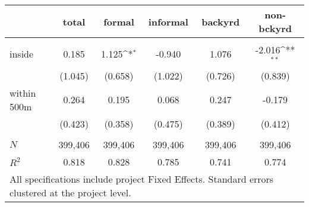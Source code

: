 {
\def\sym#1{\ifmmode^{#1}\else\(^{#1}\)\fi}
\begin{tabular}{l*{5}{c}}

          &\multicolumn{1}{c}{total}         &\multicolumn{1}{c}{formal}         &\multicolumn{1}{c}{informal}         &\multicolumn{1}{c}{backyrd}         &\multicolumn{1}{c}{non-bckyrd}         \\[0.2em]
\hline\\[-0.9em]
inside &    0.185      &    1.125\sym{*}  &   -0.940         &    1.076     &   -2.016\sym{**} \\
       &  (1.045)      &  (0.658)         &  (1.022)         &  (0.726)     &  (0.839)         \\
[.5em]
within 500m&    0.264  &    0.195         &    0.068         &    0.247     &   -0.179         \\
           &  (0.423)  &  (0.358)         &  (0.475)         &  (0.389)     &  (0.412)  \\[0.2em]
\hline\\[-0.9em]
\(N\)     &   399,406  &   399,406        &   399,406        &   399,406    &   399,406         \\
\(R^{2}\) &    0.818   &    0.828         &    0.785         &    0.741     &    0.774         \\[0.2em]
\hline
\multicolumn{6}{l}{\tiny All specifications include project Fixed Effects. Standard errors clustered at the project level.}
\end{tabular}
}
